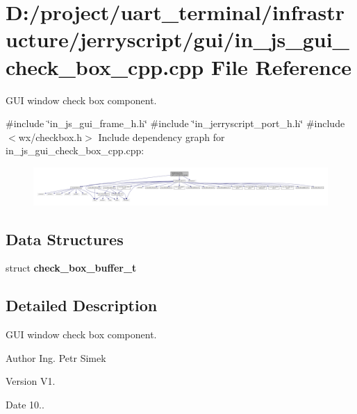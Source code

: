 \section{D\+:/project/uart\+\_\+terminal/infrastructure/jerryscript/gui/in\+\_\+js\+\_\+gui\+\_\+check\+\_\+box\+\_\+cpp.cpp File Reference}
\label{in__js__gui__check__box__cpp_8cpp}


G\+UI window check box component.  


{\ttfamily \#include \char`\"{}in\+\_\+js\+\_\+gui\+\_\+frame\+\_\+h.\+h\char`\"{}}\newline
{\ttfamily \#include \char`\"{}in\+\_\+jerryscript\+\_\+port\+\_\+h.\+h\char`\"{}}\newline
{\ttfamily \#include $<$wx/checkbox.\+h$>$}\newline
Include dependency graph for in\+\_\+js\+\_\+gui\+\_\+check\+\_\+box\+\_\+cpp.\+cpp\+:
\nopagebreak
\begin{figure}[H]
\begin{center}
\leavevmode
\includegraphics[width=350pt]{in__js__gui__check__box__cpp_8cpp__incl}
\end{center}
\end{figure}
\subsection*{Data Structures}
\begin{DoxyCompactItemize}
\item 
struct \textbf{ check\+\_\+box\+\_\+buffer\+\_\+t}
\end{DoxyCompactItemize}


\subsection{Detailed Description}
G\+UI window check box component. 

\begin{DoxyAuthor}{Author}
Ing. Petr Simek 
\end{DoxyAuthor}
\begin{DoxyVersion}{Version}
V1. 
\end{DoxyVersion}
\begin{DoxyDate}{Date}
10.. 
\end{DoxyDate}
